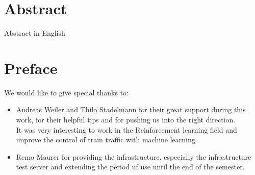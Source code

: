 \newpage
\thispagestyle{empty}
\chapter*{Abstract}\label{abstract}
Abstract in English


\chapter*{Preface}\label{preface}
We would like to give special thanks to:
\begin{itemize}
    \item Andreas Weiler and Thilo Stadelmann for their great support during this work, for their helpful tips and for pushing us into the right direction.\\It was very interesting to work in the Reinforcement learning field and improve the control of train traffic with machine learning.
    \item Remo Maurer for providing the infrastructure, especially the infrastructure test server and extending the period uf use until the end of the semester.
\end{itemize}

